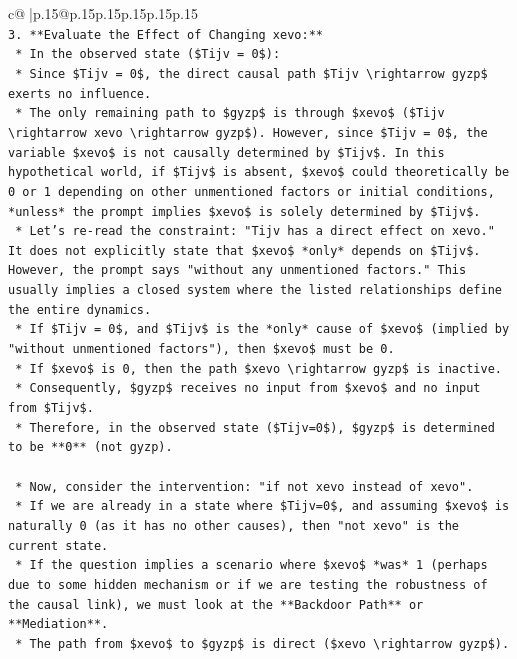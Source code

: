 \documentclass{article}
\begin{document}
{\begin{supertabular}{c@{$\;$}|p{.15\linewidth}@{}p{.15\linewidth}p{.15\linewidth}p{.15\linewidth}p{.15\linewidth}p{.15\linewidth}}
{{{\\ 
\texttt{3.  **Evaluate the Effect of Changing xevo:**} \\
\texttt{    *   In the observed state (\$Tijv = 0\$):} \\
\texttt{        *   Since \$Tijv = 0\$, the direct causal path \$Tijv \textbackslash{}rightarrow gyzp\$ exerts no influence.} \\
\texttt{        *   The only remaining path to \$gyzp\$ is through \$xevo\$ (\$Tijv \textbackslash{}rightarrow xevo \textbackslash{}rightarrow gyzp\$). However, since \$Tijv = 0\$, the variable \$xevo\$ is not causally determined by \$Tijv\$. In this hypothetical world, if \$Tijv\$ is absent, \$xevo\$ could theoretically be 0 or 1 depending on other unmentioned factors or initial conditions, *unless* the prompt implies \$xevo\$ is solely determined by \$Tijv\$.} \\
\texttt{    *   Let's re{-}read the constraint: "Tijv has a direct effect on xevo." It does not explicitly state that \$xevo\$ *only* depends on \$Tijv\$. However, the prompt says "without any unmentioned factors." This usually implies a closed system where the listed relationships define the entire dynamics.} \\
\texttt{    *   If \$Tijv = 0\$, and \$Tijv\$ is the *only* cause of \$xevo\$ (implied by "without unmentioned factors"), then \$xevo\$ must be 0.} \\
\texttt{    *   If \$xevo\$ is 0, then the path \$xevo \textbackslash{}rightarrow gyzp\$ is inactive.} \\
\texttt{    *   Consequently, \$gyzp\$ receives no input from \$xevo\$ and no input from \$Tijv\$.} \\
\texttt{    *   Therefore, in the observed state (\$Tijv=0\$), \$gyzp\$ is determined to be **0** (not gyzp).} \\
\\ 
\texttt{    *   Now, consider the intervention: "if not xevo instead of xevo".} \\
\texttt{    *   If we are already in a state where \$Tijv=0\$, and assuming \$xevo\$ is naturally 0 (as it has no other causes), then "not xevo" is the current state.} \\
\texttt{    *   If the question implies a scenario where \$xevo\$ *was* 1 (perhaps due to some hidden mechanism or if we are testing the robustness of the causal link), we must look at the **Backdoor Path** or **Mediation**.} \\
\texttt{    *   The path from \$xevo\$ to \$gyzp\$ is direct (\$xevo \textbackslash{}rightarrow gyzp\$).} \\
}}}
\end{supertabular}}
\end{document}
